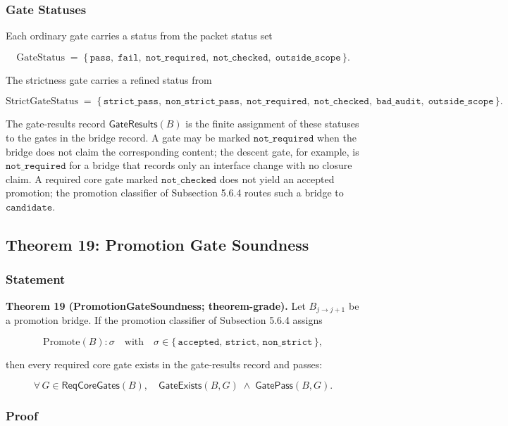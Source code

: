 \documentclass[11pt]{article}
\theoremstyle{definition}
\begin{document}
\subsubsection{Gate Statuses}

Each ordinary gate carries a status from the packet status set

\[
\mathrm{GateStatus}\;=\;\{\,\texttt{pass},\;\texttt{fail},\;\texttt{not\_required},\;\texttt{not\_checked},\;\texttt{outside\_scope}\,\}.
\]

The strictness gate carries a refined status from

\[
\mathrm{StrictGateStatus}\;=\;\{\,\texttt{strict\_pass},\;\texttt{non\_strict\_pass},\;\texttt{not\_required},\;\texttt{not\_checked},\;\texttt{bad\_audit},\;\texttt{outside\_scope}\,\}.
\]

The gate-results record \(\mathsf{GateResults}(B)\) is the finite assignment of these statuses to the gates in the bridge record. A gate may be marked \(\texttt{not\_required}\) when the bridge does not claim the corresponding content; the descent gate, for example, is \(\texttt{not\_required}\) for a bridge that records only an interface change with no closure claim. A required core gate marked \(\texttt{not\_checked}\) does not yield an accepted promotion; the promotion classifier of Subsection 5.6.4 routes such a bridge to \(\texttt{candidate}\).

\subsection{Theorem 19: Promotion Gate Soundness}

\subsubsection{Statement}

\textbf{Theorem 19 (PromotionGateSoundness; theorem-grade).} Let \(B_{j\to j+1}\) be a promotion bridge. If the promotion classifier of Subsection 5.6.4 assigns

\[
\mathrm{Promote}(B):\sigma\quad\text{with}\quad\sigma\in\{\,\texttt{accepted},\,\texttt{strict},\,\texttt{non\_strict}\,\},
\]

then every required core gate exists in the gate-results record and passes:

\[
\forall\,G\in\mathsf{ReqCoreGates}(B),\quad\mathsf{GateExists}(B,G)\;\wedge\;\mathsf{GatePass}(B,G).
\]

\subsubsection{Proof}
\end{document}
